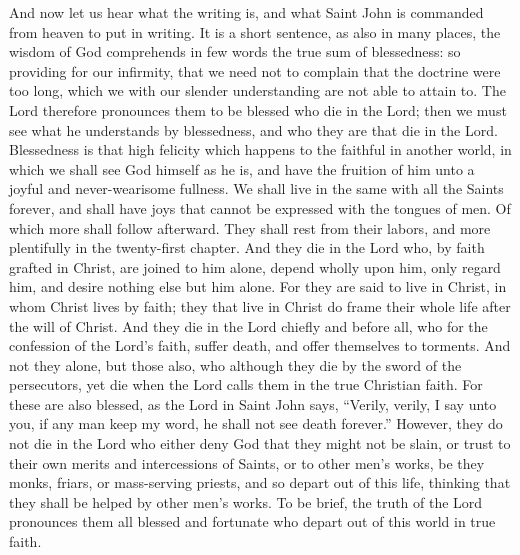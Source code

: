 And now let us hear what the writing is, and what Saint John is commanded from heaven to put in writing. It is a short sentence, as also in many places, the wisdom of God comprehends in few words the true sum of blessedness: so providing for our infirmity, that we need not to complain that the doctrine were too long, which we with our slender understanding are not able to attain to. The Lord therefore pronounces them to be blessed who die in the Lord; then we must see what he understands by blessedness, and who they are that die in the Lord. Blessedness is that high felicity which happens to the faithful in another world, in which we shall see God himself as he is, and have the fruition of him unto a joyful and never-wearisome fullness. We shall live in the same with all the Saints forever, and shall have joys that cannot be expressed with the tongues of men. Of which more shall follow afterward. They shall rest from their labors, and more plentifully in the twenty-first chapter. And they die in the Lord who, by faith grafted in Christ, are joined to him alone, depend wholly upon him, only regard him, and desire nothing else but him alone. For they are said to live in Christ, in whom Christ lives by faith; they that live in Christ do frame their whole life after the will of Christ. And they die in the Lord chiefly and before all, who for the confession of the Lord’s faith, suffer death, and offer themselves to torments. And not they alone, but those also, who although they die by the sword of the persecutors, yet die when the Lord calls them in the true Christian faith. For these are also blessed, as the Lord in Saint John says, “Verily, verily, I say unto you, if any man keep my word, he shall not see death forever.” However, they do not die in the Lord who either deny God that they might not be slain, or trust to their own merits and intercessions of Saints, or to other men’s works, be they monks, friars, or mass-serving priests, and so depart out of this life, thinking that they shall be helped by other men’s works. To be brief, the truth of the Lord pronounces them all blessed and fortunate who depart out of this world in true faith.

